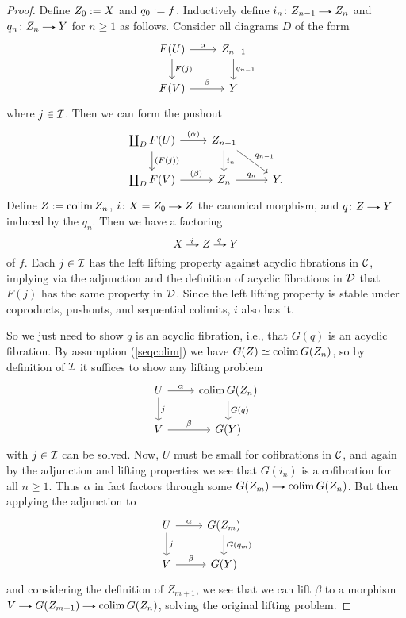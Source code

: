 \begin{proof}
  Define $Z_0 \mathrel{:=} X$ and $q_0 \mathrel{:=} f$. Inductively define
  $i_n \c Z_{n-1} \to Z_n$ and $q_n \c Z_n \to Y$ for $n \ge 1$ as
  follows. Consider all diagrams $D$ of the form
  \[
  \begin{tikzcd}
    F(U) \rar{\alpha} \dar{F(j)} & Z_{n-1} \dar{q_{n-1}} \\ F(V)
    \rar{\beta} & Y
  \end{tikzcd}
  \]
  where $j \in \mathcal{I}$. Then we can form the pushout
  \[
  \begin{tikzcd}
    \coprod_D F(U) \rar{(\alpha)} \dar{(F(j))} & Z_{n-1} \dar{i_n}
    \drar{q_{n-1}} \\ \coprod_D F(V) \rar{(\beta)} & Z_n \rar{q_n} &
    Y.
  \end{tikzcd}
  \]
  Define $Z \mathrel{:=} \operatorname{colim} Z_n$, $i \c X = Z_0 \to Z$ the canonical
  morphism, and $q \c Z \to Y$ induced by the $q_n$. Then we have a
  factoring
  \[
  X \lblto{i} Z \lblto{q} Y
  \]
  of $f$. Each $j \in \mathcal{I}$ has the left lifting property against
  acyclic fibrations in $\mathcal{C}$, implying via the adjunction and the
  definition of acyclic fibrations in $\mathcal{D}$ that $F(j)$ has the same
  property in $\mathcal{D}$. Since the left lifting property is stable under
  coproducts, pushouts, and sequential colimits, $i$ also has it.

  So we just need to show $q$ is an acyclic fibration, i.e., that
  $G(q)$ is an acyclic fibration. By assumption (\ref{seqcolim}) we
  have $G(Z) \simeq \operatorname{colim} G(Z_n)$, so by definition of $\mathcal{I}$ it
  suffices to show any lifting problem
  \[
  \begin{tikzcd}
    U \rar{\alpha} \dar{j} & \colim G(Z_n) \dar{G(q)} \\ V \rar{\beta}
    & G(Y)
  \end{tikzcd}
  \]
  with $j \in \mathcal{I}$ can be solved. Now, $U$ must be small for
  cofibrations in $\mathcal{C}$, and again by the adjunction and lifting
  properties we see that $G(i_n)$ is a cofibration for all $n \ge
  1$. Thus $\alpha$ in fact factors through some $G(Z_m) \to \colim
  G(Z_n)$. But then applying the adjunction to
  \[
  \begin{tikzcd}
    U \rar{\alpha} \dar{j} & G(Z_m) \dar{G(q_m)} \\ V \rar{\beta} &
    G(Y)
  \end{tikzcd}
  \]
  and considering the definition of $Z_{m+1}$, we see that we can lift
  $\beta$ to a morphism $V \to G(Z_{m+1}) \to \colim G(Z_n)$, solving
  the original lifting problem.
\end{proof}

